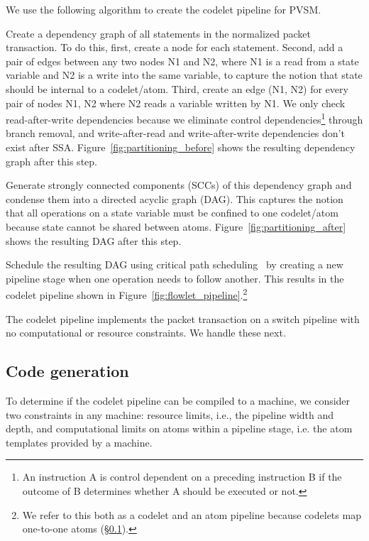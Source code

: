 We use the following algorithm to create the codelet pipeline for PVSM.
\begin{CompactEnumerate}
  \item Create a dependency graph of all statements in the normalized packet
    transaction. To do this, first, create a node for each statement. Second,
    add a pair of edges between any two nodes N1 and N2, where N1 is a read
    from a state variable and N2 is a write into the same variable, to capture
    the notion that state should be internal to a codelet/atom. Third, create
    an edge (N1, N2) for every pair of nodes N1, N2 where N2 reads a variable
    written by N1.  We only check read-after-write dependencies because we
    eliminate control dependencies\footnote{An instruction A is control
    dependent on a preceding instruction B if the outcome of B determines
    whether A should be executed or not.} through branch removal, and
    write-after-read and write-after-write dependencies don't exist after SSA.
    Figure~\ref{fig:partitioning_before} shows the resulting dependency graph
    after this step.
  \item Generate strongly connected components (SCCs) of this dependency graph
    and condense them into a directed acyclic graph (DAG). This captures the notion that all
    operations on a state variable must be confined to one codelet/atom because
    state cannot be shared between atoms. Figure~\ref{fig:partitioning_after}
    shows the resulting DAG after this step.
  \item Schedule the resulting DAG using critical path
    scheduling~\cite{crit_path_sched} by creating a new pipeline stage when one
    operation needs to follow another. This results in the codelet pipeline
    shown in Figure~\ref{fig:flowlet_pipeline}.\footnote{We refer to this both
    as a codelet and an atom pipeline because codelets map one-to-one atoms
  (\S\ref{ss:code_gen}).}
\end{CompactEnumerate}

The codelet pipeline implements the packet transaction on a switch pipeline
with no computational or resource constraints. We handle these next.

\subsection{Code generation}
\label{ss:code_gen}

To determine if the codelet pipeline can be compiled to a \absmachine machine,
we consider two constraints in any \absmachine machine: resource limits, i.e.,
the pipeline width and depth, and computational limits on atoms within a
pipeline stage, i.e. the atom templates provided by a \absmachine machine.

